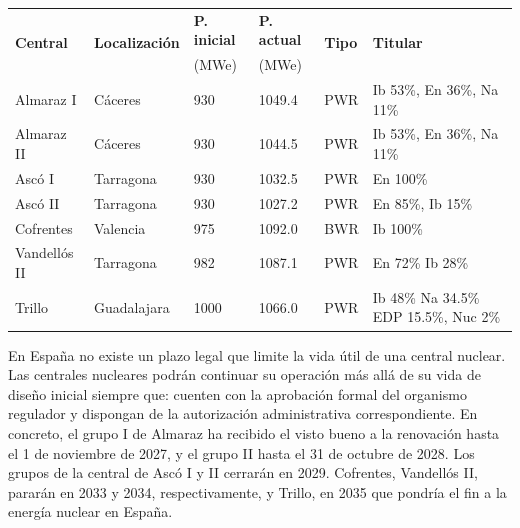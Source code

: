 			\begin{table}[H]
				\begin{tabular}{llllll}
					\multirow{2}{*}{\textbf{Central}} & \multirow{2}{*}{\textbf{Localización}} & \textbf{P. inicial} & \textbf{P. actual} & \multirow{2}{*}{\textbf{Tipo}} & \multirow{2}{*}{\textbf{Titular}} \\
					&&(MWe)&(MWe)&&\\
					\hline
					Almaraz I    & Cáceres     & 930  & 1049.4 & PWR & Ib 53\%, En 36\%, Na 11\%\\
					Almaraz II   & Cáceres     & 930  & 1044.5 & PWR & Ib 53\%, En 36\%, Na 11\%\\
					Ascó I       & Tarragona   & 930  & 1032.5 & PWR & En 100\%\\
					Ascó II      & Tarragona   & 930  & 1027.2 & PWR & En 85\%, Ib 15\%\\
					Cofrentes    & Valencia    & 975  & 1092.0 & BWR & Ib 100\%\\
					Vandellós II & Tarragona   & 982  & 1087.1 & PWR & En 72\% Ib 28\%\\
					Trillo       & Guadalajara & 1000 & 1066.0 & PWR & Ib 48\% Na 34.5\% EDP 15.5\%, Nuc 2\%\\
					\hline
				\end{tabular}
			\end{table}
			
			En España no existe un plazo legal que limite la vida útil de una central nuclear. Las centrales nucleares podrán continuar su operación más allá de su vida de diseño inicial siempre que: cuenten con la aprobación formal del organismo regulador y dispongan de la autorización administrativa correspondiente. En concreto, el grupo I de Almaraz ha recibido el visto bueno a la renovación hasta el 1 de noviembre de 2027, y el grupo II hasta el 31 de octubre de 2028. Los grupos de la central de Ascó I y II cerrarán en 2029. Cofrentes, Vandellós II, pararán en 2033 y 2034, respectivamente, y Trillo, en 2035 que pondría el fin a la energía nuclear en España.
			
			
